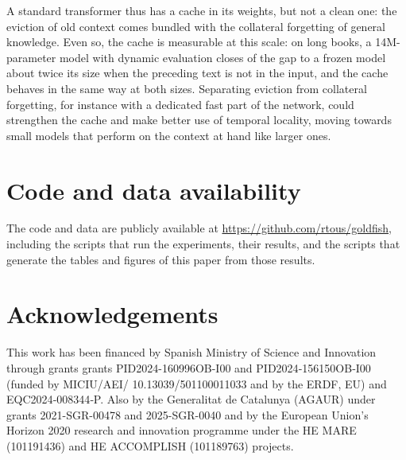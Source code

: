\documentclass[10pt]{article}
\begin{document}
A standard transformer thus has a cache in its weights, but not a clean one: the eviction of old context comes bundled with the collateral forgetting of general knowledge.
Even so, the cache is measurable at this scale: on long books, a 14M-parameter model with dynamic evaluation closes \gapClosedFourteen{} of the gap to a frozen model about twice its size when the preceding text is not in the input, and the cache behaves in the same way at both sizes.
Separating eviction from collateral forgetting, for instance with a dedicated fast part of the network, could strengthen the cache and make better use of temporal locality, moving towards small models that perform on the context at hand like larger ones.

\section*{Code and data availability}

The code and data are publicly available at \url{https://github.com/rtous/goldfish}, including the scripts that run the experiments, their results, and the scripts that generate the tables and figures of this paper from those results.

\section*{Acknowledgements}

This work has been financed by Spanish Ministry of Science and Innovation through grants grants PID2024-160996OB-I00 and PID2024‑156150OB‑I00 (funded by MICIU/AEI/ 10.13039/501100011033 and by the ERDF, EU) and EQC2024‑008344‑P. Also by the Generalitat de Catalunya (AGAUR) under grants 2021-SGR-00478 and 2025-SGR-0040 and by the European Union’s Horizon 2020 research and innovation programme under the HE MARE (101191436) and HE ACCOMPLISH (101189763) projects.

{\small
\setlength{\bibsep}{1.5pt plus 0.5pt}


}
\end{document}
